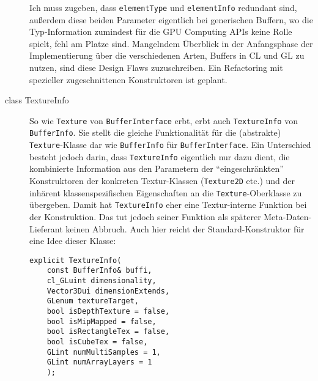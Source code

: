 \begin{description}
		Ich muss zugeben, dass \lstinline|elementType| und \lstinline|elementInfo| redundant sind, außerdem diese 
		beiden Parameter eigentlich bei generischen Buffern, wo die Typ-Information zumindest für die GPU Computing APIs
		keine Rolle spielt, fehl am Platze sind. Mangelndem Überblick in der Anfangsphase der Implementierung
		über die verschiedenen Arten, Buffers in CL und GL zu nutzen, sind diese Design Flaws zuzuschreiben.
		Ein Refactoring mit spezieller zugeschnittenen Konstruktoren ist geplant.
	
	\item[class TextureInfo]
		So wie \lstinline|Texture| von \lstinline|BufferInterface| erbt, erbt auch 
		\lstinline|TextureInfo| von \lstinline|BufferInfo|. Sie stellt die gleiche Funktionalität für
		die (abstrakte) \lstinline|Texture|-Klasse dar wie \lstinline|BufferInfo| für \lstinline|BufferInterface|.
		Ein Unterschied besteht jedoch darin, dass \lstinline|TextureInfo| eigentlich nur dazu dient, 
		die kombinierte Information aus den Parametern der "`eingeschränkten"' Konstruktoren 
		der konkreten Textur-Klassen (\lstinline|Texture2D| etc.) und der inhärent klassenspezifischen
		Eigenschaften an die \lstinline|Texture|-Oberklasse zu übergeben. Damit hat \lstinline|TextureInfo|
		eher eine Textur-interne Funktion bei der Konstruktion. Das tut jedoch seiner Funktion als späterer
		Meta-Daten-Lieferant keinen Abbruch.
		Auch hier reicht der Standard-Konstruktor für eine Idee dieser Klasse:
		 
		\begin{lstlisting}	
explicit TextureInfo(
	const BufferInfo& buffi,
	cl_GLuint dimensionality,
	Vector3Dui dimensionExtends,
	GLenum textureTarget,
	bool isDepthTexture = false,
	bool isMipMapped = false,
	bool isRectangleTex = false,
	bool isCubeTex = false,
	GLint numMultiSamples = 1,
	GLint numArrayLayers = 1
	);
		\end{lstlisting}			
			
	\end{description}	

